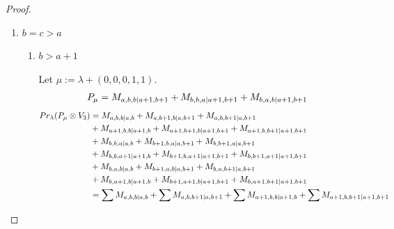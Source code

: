 \begin{proof}
\begin{enumerate}
\begin{enumerate}
\begin{table}[htbp]
\begin{tabular}{cc}
\midrule
 $P_{b+1,a+1,a+1|a+1,b+1}$ & \makecell{
 $M_{b+2,a+1,a+1|a+1,b+2}$,
 $M_{b+1,a+2,a+1|a+2,b+1}$,
 $M_{b+1,a+1,a+2|a+2,b+1}$,
 $M_{b+2,a+2,a+1|a+2,b+2}$, \\
 $M_{b+2,a+1,a+2|a+2,b+2}$
}\\
 & \\
 $P_{a+1,b+1,a+1|a+1,b+1}$ & \makecell{
 $M_{a+2,b+1,a+1|a+2,b+1}$,
 $M_{a+1,b+2,a+1|a+1,b+2}$,
 $M_{a+1,b+1,a+2|a+2,b+1}$,
 $M_{a+1,b+2,a+2|a+2,b+2}$, \\
 $M_{b+1,a+2,a+1|a+2,b+1}$,
 $M_{b+2,a+1,a+1|a+1,b+2}$,
 $M_{b+1,a+1,a+2|a+2,b+1}$,
 $M_{b+2,a+1,a+2|a+2,b+2}$, \\
 $M_{a+2,b+2,a+1|a+2,b+2}$,
 $M_{b+2,a+2,a+1|a+2,b+2}$
}\\
\bottomrule
\end{tabular}
\vspace{0.5em}
\parbox{\linewidth}{\small
\textbf{Interpretation:}
This table displays only selected computational results. This partial presentation does not affect our conclusion.
}
\end{table}
      \end{enumerate}
    \item $b=c>a$
      \begin{enumerate}
        \item $b>a+1$ \par
        Let $\mu:=\lambda + (0,0,0,1,1) $.
        \begin{equation}\notag
          \begin{aligned}
            P_\mu = M_{a,b,b|a+1,b+1}
+ M_{b,b,a|a+1,b+1}
+ M_{b,a,b|a+1,b+1}
          \end{aligned}
        \end{equation}
        \begin{equation}\notag
          \begin{aligned}
            Pr_{\lambda}(P_\mu \otimes V_{3}) &=
M_{a,b,b|a,b}
+ M_{a,b+1,b|a,b+1}
+ M_{a,b,b+1|a,b+1}\\
                                              &
+ M_{a+1,b,b|a+1,b}
+ M_{a+1,b+1,b|a+1,b+1}
+ M_{a+1,b,b+1|a+1,b+1}\\
                                              &
+ M_{b,b,a|a,b}
+ M_{b+1,b,a|a,b+1}
+ M_{b,b+1,a|a,b+1}\\
                                              &
+ M_{b,b,a+1|a+1,b}
+ M_{b+1,b,a+1|a+1,b+1}
+ M_{b,b+1,a+1|a+1,b+1}\\
                                              &
+ M_{b,a,b|a,b}
+ M_{b+1,a,b|a,b+1}
+ M_{b,a,b+1|a,b+1}\\
                                              &
+ M_{b,a+1,b|a+1,b}
+ M_{b+1,a+1,b|a+1,b+1}
+ M_{b,a+1,b+1|a+1,b+1} \\
                                               &=
\sum M_{a,b,b|a,b}
+ \sum M_{a,b,b+1|a,b+1}
+ \sum M_{a+1,b,b|a+1,b}
+ \sum M_{a+1,b,b+1|a+1,b+1}
          \end{aligned}
        \end{equation}


\end{enumerate}
\end{enumerate}
\end{proof}
